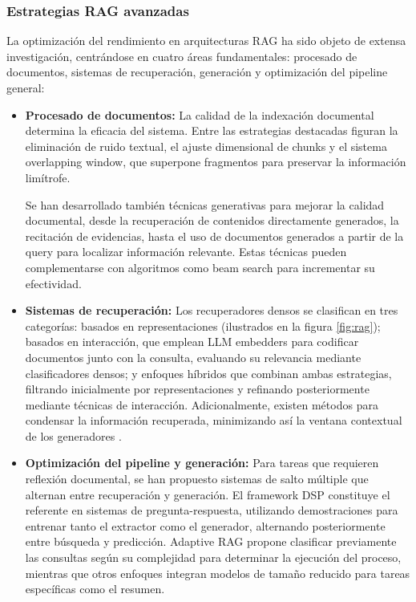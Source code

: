 \subsubsection{Estrategias RAG avanzadas}
La optimización del rendimiento en arquitecturas RAG ha sido objeto de extensa investigación\cite{zhu_retrieving_2021}\cite{gao_retrieval-augmented_2024}, centrándose en cuatro áreas fundamentales: procesado de documentos, sistemas de recuperación, generación y optimización del pipeline general:
\begin{itemize}
  \item {\textbf{Procesado de documentos:}} La calidad de la indexación documental determina la eficacia del sistema. Entre las estrategias destacadas figuran la eliminación de ruido textual, el ajuste dimensional de chunks y el sistema overlapping window, que superpone fragmentos para preservar la información limítrofe. 
  
  Se han desarrollado también técnicas generativas para mejorar la calidad documental, desde la recuperación de contenidos directamente generados\cite{yu_generate_2023}, la recitación de evidencias\cite{sun_recitation-augmented_2023}, hasta el uso de documentos generados a partir de la query para localizar información relevante\cite{gao_precise_2023}. Estas técnicas pueden complementarse con algoritmos como beam search para incrementar su efectividad\cite{cheng_lift_nodate}\cite{cho_improving_2023-1}\cite{yoran_answering_2024}.
  
  \item {\textbf{Sistemas de recuperación:}} Los recuperadores densos se clasifican en tres categorías: basados en representaciones (ilustrados en la figura \ref{fig:rag}); basados en interacción, que emplean LLM embedders para codificar documentos junto con la consulta, evaluando su relevancia mediante clasificadores densos\cite{ma_query_nodate}\cite{levine_standing_2022}; y enfoques híbridos que combinan ambas estrategias, filtrando inicialmente por representaciones y refinando posteriormente mediante técnicas de interacción\cite{khattab_relevance-guided_2021}. Adicionalmente, existen métodos para condensar la información recuperada, minimizando así la ventana contextual de los generadores \cite{khattab_baleen_nodate}\cite{xu_recomp_2023}.
  
  \item {\textbf{Optimización del pipeline y generación:}} Para tareas que requieren reflexión documental, se han propuesto sistemas de salto múltiple que alternan entre recuperación y generación\cite{shao_enhancing_2023}\cite{qi_answering_2021}\cite{zheng_take_2024}\cite{trivedi_interleaving_2023}. El framework DSP\cite{khattab_demonstrate-search-predict_2023} constituye el referente en sistemas de pregunta-respuesta, utilizando demostraciones para entrenar tanto el extractor como el generador, alternando posteriormente entre búsqueda y predicción. Adaptive RAG\cite{jeong_adaptive-rag_2024} propone clasificar previamente las consultas según su complejidad para determinar la ejecución del proceso, mientras que otros enfoques integran modelos de tamaño reducido para tareas específicas como el resumen\cite{ma_large_2023}.
\end{itemize}

